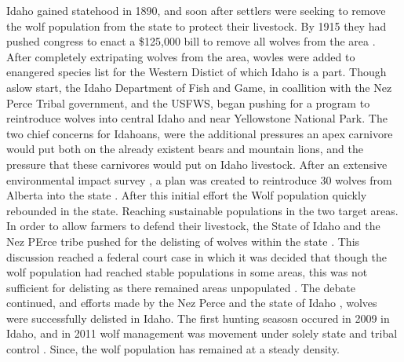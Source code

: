 \documentclass[12pt]{article}
\begin{document}
Idaho gained statehood in 1890, and soon after settlers were seeking to remove the wolf population from the state to protect their livestock.
By 1915 they had pushed congress to enact a \$125,000 bill to remove all wolves from the area \cite{IdahoBackground}. 
After completely extripating wolves from the area, wovles were added to enangered species list for the Western Distict of which Idaho is a part.
Though  aslow start, the Idaho Department of Fish and Game, in coallition with the Nez Perce Tribal government, and the USFWS,
    began pushing for a program to reintroduce wolves into central Idaho and near Yellowstone National Park.
The two chief concerns for Idahoans, were the additional pressures an apex carnivore would put both on the already existent bears and mountain lions,
    and the pressure that these carnivores would put on Idaho livestock.
After an extensive environmental impact survey \cite{IdahoBackground}, 
    a plan was created to reintroduce 30 wolves from Alberta into the state \cite{WolvesReintroducedBCID}.
After this initial effort the Wolf population quickly rebounded in the state.
Reaching sustainable populations in the two target areas.
In order to allow farmers to defend their livestock,
    the State of Idaho and the Nez PErce tribe pushed for the delisting of wolves within the state \cite{2002ReportID}.
This discussion reached a federal court case in which it was decided that though the wolf population
    had reached stable populations in some areas, this was not sufficient for delisting as there remained areas unpopulated \cite{IdCase}.
The debate continued, and efforts made by the Nez Perce \cite{NezPerceLetter}
    and the state of Idaho \cite{IdahoBackground},
    wolves were successfully delisted in Idaho.
The first hunting seasosn occured in 2009 in Idaho,
    and in 2011 wolf management was movement under solely state and tribal control \cite{IdahoBackground}.
Since, the wolf population has remained at a steady density.
\end{document}
